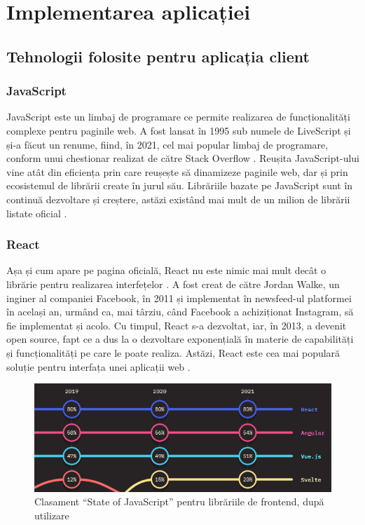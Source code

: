 \chapter{Implementarea aplicației}

\section{Tehnologii folosite pentru aplicația client}

\subsection{JavaScript}

JavaScript este un limbaj de programare ce permite realizarea de funcționalități complexe pentru paginile web. A fost lansat în 1995 sub numele de LiveScript \cite{brandan_eich_js} și și-a făcut un renume, fiind, în 2021, cel mai popular limbaj de programare, conform unui chestionar realizat de către Stack Overflow \cite{js_stackoverflow}. Reușita JavaScript-ului vine atât din eficiența prin care reușește să dinamizeze paginile web, dar și prin ecosistemul de librării create în jurul său. Librăriile bazate pe JavaScript sunt în continuă dezvoltare și creștere, astăzi existând mai mult de un milion de librării listate oficial \cite{number_of_js_libraries}.

\subsection{React}

Așa și cum apare pe pagina oficială, React nu este nimic mai mult decât o librărie pentru realizarea interfețelor \cite{react_webpage}. A fost creat de către Jordan Walke, un inginer al companiei Facebook, în 2011 și implementat în newsfeed-ul platformei în același an, urmând ca, mai târziu, când Facebook a achiziționat Instagram, să fie implementat și acolo. Cu timpul, React s-a dezvoltat, iar, în 2013, a devenit open source, fapt ce a dus la o dezvoltare exponențială în materie de capabilități și funcționalități pe care le poate realiza. Astăzi, React este cea mai populară soluție pentru interfața unei aplicații web \cite{popularity_of_react}.

\newpage

\begin{figure}[!ht]
    \centering
    \includegraphics[width=135mm]{images/react_popularity.png}
    \caption{Clasament \enquote{State of JavaScript} pentru librăriile de frontend, după utilizare}
\end{figure}


